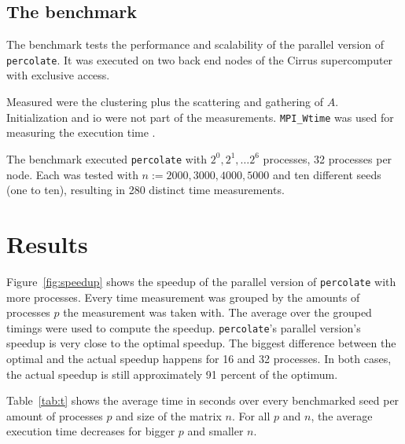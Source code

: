 \documentclass[twoside,11pt]{article}
\def\perc{\texttt{perco\-late}}
\begin{document}


\subsection{The benchmark}
\label{subsec:bench}

The benchmark tests the performance and scalability of the
parallel version of \perc{}.
It was executed on two back end nodes of the Cirrus
supercomputer with exclusive access.

Measured were the clustering plus the scattering and
gathering of $A$.
Initialization and io were not part of the measurements.
\texttt{MPI\_Wtime} was used for measuring the execution
time \citep[see][Chapter 8]{mpi}.

The benchmark executed \perc{} with $2^0,2^1,\dots2^6$
processes, 32 processes per node.
Each was tested with $n := 2000, 3000, 4000, 5000$
and ten different seeds (one to ten), resulting in 280
distinct time measurements.



\section{Results} %

Figure~\ref{fig:speedup} shows the speedup of the parallel
version of \perc{} with more processes.
Every time measurement was grouped by the amounts of
processes $p$ the measurement was taken with.
The average over the grouped timings were used to compute
the speedup.
\perc{}'s parallel version's speedup is very close to the
optimal speedup.
The biggest difference between the optimal and the actual
speedup happens for 16 and 32 processes. In both cases,
the actual speedup is still approximately 91 percent of the
optimum.

Table~\ref{tab:t} shows the average time in seconds over
every benchmarked seed per amount of processes $p$ and size
of the matrix $n$.
For all $p$ and $n$, the average execution time decreases
for bigger $p$ and smaller $n$.
\end{document}
